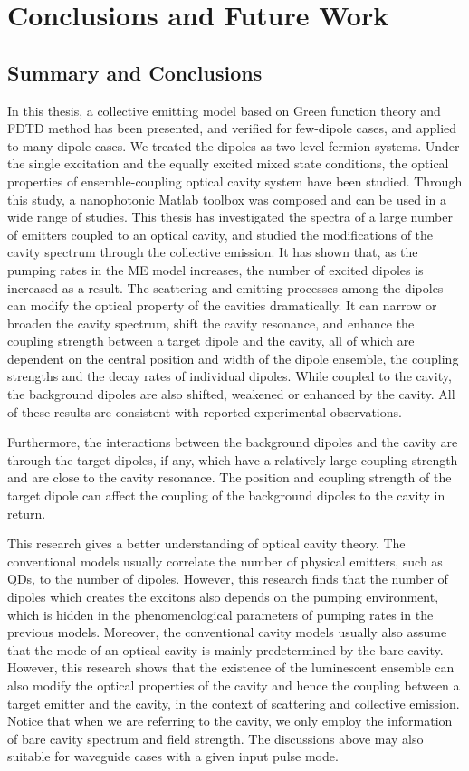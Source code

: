 \chapter{Conclusions and Future Work}\label{ch:Conclusion}
\section{Summary and Conclusions}
In this thesis, a collective emitting model based on Green function theory and FDTD method has been presented, and verified for few-dipole cases, and applied to many-dipole cases. We treated the dipoles as two-level fermion systems. Under the single excitation and the equally excited mixed state conditions, the optical properties of ensemble-coupling optical cavity system have been studied. Through this study, a nanophotonic Matlab toolbox was composed and can be used in a wide range of studies.
This thesis has investigated the spectra of a large number of emitters coupled to an optical cavity, and studied the modifications of the cavity spectrum through the collective emission. It has shown that, as the pumping rates in the ME model increases, the number of excited dipoles is increased as a result. The scattering and emitting processes among the dipoles can modify the optical property of the cavities dramatically. It can narrow or broaden the cavity spectrum, shift the cavity resonance, and enhance the coupling strength between a target dipole and the cavity, all of which are dependent on the central position and width of the dipole ensemble, the coupling strengths and the decay rates of individual dipoles. While coupled to the cavity, the background dipoles are also shifted, weakened or enhanced by the cavity. All of these results are consistent with reported experimental observations.

Furthermore, the interactions between the background dipoles and the cavity are through the target dipoles, if any, which have a relatively large coupling strength and are close to the cavity resonance. The position and coupling strength of the target dipole can affect the coupling of the background dipoles to the cavity in return.

This research gives a better understanding of optical cavity theory. The conventional models usually correlate the number of physical emitters, such as QDs, to the number of dipoles. However, this research finds that the number of dipoles which creates the excitons also depends on the pumping environment, which is hidden in the phenomenological parameters of pumping rates in the previous models. Moreover, the conventional cavity models usually also assume that the mode of an optical cavity is mainly predetermined by the bare cavity. However, this research shows that the existence of the luminescent ensemble can also modify the optical properties of the cavity and hence the coupling between a target emitter and the cavity, in the context of scattering and collective emission. Notice that when we are referring to the cavity, we only employ the information of bare cavity spectrum and field strength. The discussions above may also suitable for waveguide cases with a given input pulse mode.

